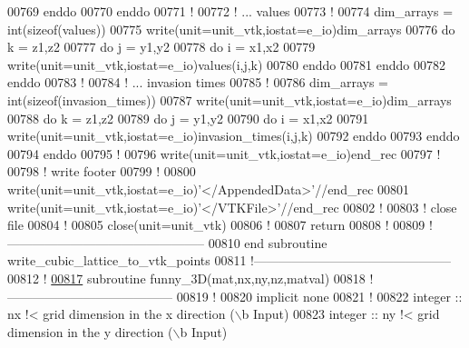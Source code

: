 \begin{DoxyCode}
00769    \textcolor{keyword}{enddo}
00770 \textcolor{keyword}{enddo}
00771 \textcolor{comment}{!}
00772 \textcolor{comment}{! ... values}
00773 \textcolor{comment}{!}
00774 dim\_arrays = int(sizeof(values))
00775 \textcolor{keyword}{write}(unit=unit\_vtk,iostat=e\_io)dim\_arrays
00776 \textcolor{keyword}{do} k = z1,z2
00777    \textcolor{keyword}{do} j = y1,y2
00778       \textcolor{keyword}{do} i = x1,x2
00779          \textcolor{keyword}{write}(unit=unit\_vtk,iostat=e\_io)values(i,j,k)
00780       \textcolor{keyword}{enddo}
00781    \textcolor{keyword}{enddo}
00782 \textcolor{keyword}{enddo}
00783 \textcolor{comment}{!}
00784 \textcolor{comment}{! ... invasion times}
00785 \textcolor{comment}{!}
00786 dim\_arrays = int(sizeof(invasion\_times))
00787 \textcolor{keyword}{write}(unit=unit\_vtk,iostat=e\_io)dim\_arrays
00788 \textcolor{keyword}{do} k = z1,z2
00789    \textcolor{keyword}{do} j = y1,y2
00790       \textcolor{keyword}{do} i = x1,x2
00791          \textcolor{keyword}{write}(unit=unit\_vtk,iostat=e\_io)invasion\_times(i,j,k)
00792       \textcolor{keyword}{enddo}
00793    \textcolor{keyword}{enddo}
00794 \textcolor{keyword}{enddo}
00795 \textcolor{comment}{!}
00796 \textcolor{keyword}{write}(unit=unit\_vtk,iostat=e\_io)end\_rec
00797 \textcolor{comment}{!}
00798 \textcolor{comment}{! write footer}
00799 \textcolor{comment}{!}
00800 \textcolor{keyword}{write}(unit=unit\_vtk,iostat=e\_io)\textcolor{stringliteral}{'</AppendedData>'}//end\_rec
00801 \textcolor{keyword}{write}(unit=unit\_vtk,iostat=e\_io)\textcolor{stringliteral}{'</VTKFile>'}//end\_rec
00802 \textcolor{comment}{!}
00803 \textcolor{comment}{! close file}
00804 \textcolor{comment}{!}
00805 \textcolor{keyword}{close}(unit=unit\_vtk)
00806 \textcolor{comment}{!}
00807 return
00808 \textcolor{comment}{!}
00809 \textcolor{comment}{!-----------------------------------------------}
00810 \textcolor{keyword}{end subroutine write\_cubic\_lattice\_to\_vtk\_points}
00811 \textcolor{comment}{!-----------------------------------------------}
00812 \textcolor{comment}{!}
\hypertarget{module__write__output__files_8f90_source_l00817}{}\hyperlink{classmodule__write__output__files_a142e1aedf3a8689d5a8741677c83140d}{00817} \textcolor{keyword}{subroutine }funny\_3D(mat,nx,ny,nz,matval)
00818 \textcolor{comment}{!---------------------------------------}
00819 \textcolor{comment}{!}
00820 \textcolor{keyword}{implicit none}
00821 \textcolor{comment}{!}
00822 \textcolor{keywordtype}{integer} :: nx \textcolor{comment}{!< grid dimension in the x direction (\(\backslash\)b Input)}
00823 \textcolor{keywordtype}{integer} :: ny \textcolor{comment}{!< grid dimension in the y direction (\(\backslash\)b Input)}

\end{DoxyCode}
